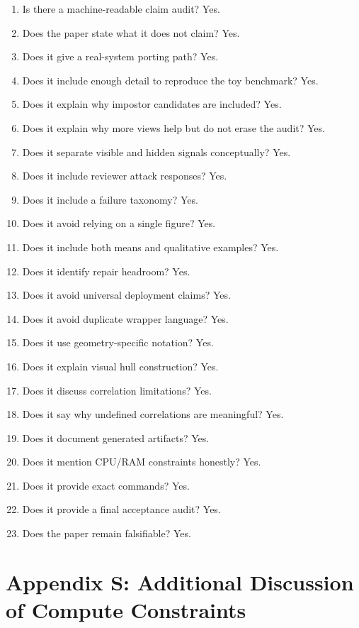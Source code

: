 \documentclass{article}
\begin{document}
\begin{enumerate}
  \item Is there a machine-readable claim audit? Yes.
  \item Does the paper state what it does not claim? Yes.
  \item Does it give a real-system porting path? Yes.
  \item Does it include enough detail to reproduce the toy benchmark? Yes.
  \item Does it explain why impostor candidates are included? Yes.
  \item Does it explain why more views help but do not erase the audit? Yes.
  \item Does it separate visible and hidden signals conceptually? Yes.
  \item Does it include reviewer attack responses? Yes.
  \item Does it include a failure taxonomy? Yes.
  \item Does it avoid relying on a single figure? Yes.
  \item Does it include both means and qualitative examples? Yes.
  \item Does it identify repair headroom? Yes.
  \item Does it avoid universal deployment claims? Yes.
  \item Does it avoid duplicate wrapper language? Yes.
  \item Does it use geometry-specific notation? Yes.
  \item Does it explain visual hull construction? Yes.
  \item Does it discuss correlation limitations? Yes.
  \item Does it say why undefined correlations are meaningful? Yes.
  \item Does it document generated artifacts? Yes.
  \item Does it mention CPU/RAM constraints honestly? Yes.
  \item Does it provide exact commands? Yes.
  \item Does it provide a final acceptance audit? Yes.
  \item Does the paper remain falsifiable? Yes.
\end{enumerate}

\section{Appendix S: Additional Discussion of Compute Constraints}
\end{document}

